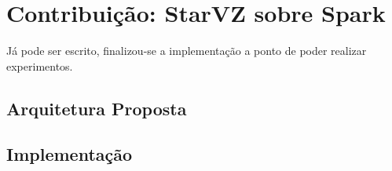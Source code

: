 \chapter{Contribuição: StarVZ sobre Spark} \label{ch:contribution}

Já pode ser escrito, finalizou-se a implementação a ponto de poder realizar 
experimentos.

\section{Arquitetura Proposta}

\section{Implementação}